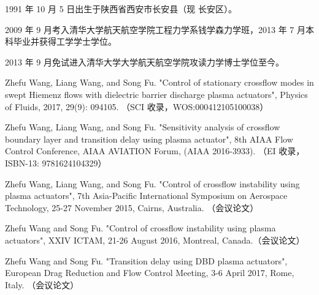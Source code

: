 \begin{resume}


  1991 年 10 月 5 日出生于陕西省西安市长安县（现 长安区）。

  2009 年 9 月考入清华大学航天航空学院工程力学系钱学森力学班，2013 年 7 月本科毕业并获得工学学士学位。

  2013 年 9 月免试进入清华大学大学航天航空学院攻读力学博士学位至今。


  \begin{publications}
    \item Zhefu Wang, Liang Wang, and Song Fu. "Control of stationary crossflow modes in swept Hiemenz flows with dielectric barrier discharge plasma actuators", Physics of Fluids, 2017, 29(9): 094105. （SCI 收录，WOS:000412105100038）
    \item Zhefu Wang, Liang Wang, and Song Fu. "Sensitivity analysis of crossflow boundary layer and transition delay using plasma actuator", 8th AIAA Flow Control Conference, AIAA AVIATION Forum, (AIAA 2016-3933). （EI 收录，ISBN-13: 9781624104329）
    \item Zhefu Wang, Liang Wang, and Song Fu. "Control of crossflow instability using plasma actuators", 7th Asia-Pacific International Symposium on Aerospace Technology, 25-27 November 2015, Cairns, Australia. （会议论文）
    \item Zhefu Wang and Song Fu. "Control of crossflow instability using plasma actuators", XXIV ICTAM, 21-26 August 2016, Montreal, Canada.（会议论文）
    \item Zhefu Wang and Song Fu. "Transition delay using DBD plasma actuators", European Drag Reduction and Flow Control Meeting, 3-6 April 2017, Rome, Italy. （会议论文）
  \end{publications}



\end{resume}
